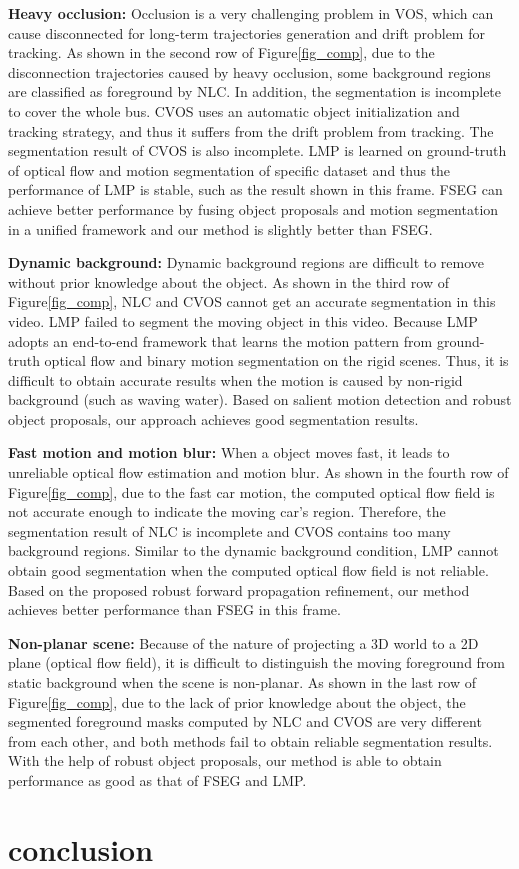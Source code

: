 \documentclass[journal]{IEEEtran}
\makeatletter
\newcommand{\fig}{{Figure}\@\xspace}
\makeatother
\begin{document}
\textbf{Heavy occlusion:}
Occlusion is a very challenging problem in VOS, which can cause disconnected for long-term trajectories generation and drift problem for tracking.
As shown in the second row of \fig \ref{fig_comp}, 
due to the disconnection trajectories caused by heavy occlusion,
some background regions are classified as foreground by NLC.
In addition, the segmentation is incomplete to cover the whole bus.
CVOS uses an automatic object initialization and tracking strategy,
and thus it suffers from the drift problem from tracking.
The segmentation result of CVOS is also incomplete.
LMP is learned on ground-truth of optical flow and motion segmentation of specific dataset and thus the performance of LMP is stable, such as the result shown in this frame.
FSEG can achieve better performance by fusing object proposals and motion segmentation in a unified framework and our method is slightly better than FSEG.

\textbf{Dynamic background:} 
Dynamic background regions are difficult to remove without prior knowledge about the object.
As shown in the third row of \fig \ref{fig_comp}, 
NLC and CVOS cannot get an accurate segmentation in this video.
LMP failed to segment the moving object in this video.
Because LMP adopts an end-to-end framework that learns the motion pattern from ground-truth optical flow and binary motion segmentation on the rigid scenes.
Thus, it is difficult to obtain accurate results when the motion is caused by non-rigid background (such as waving water).
Based on salient motion detection and robust object proposals, 
our approach achieves good segmentation results.

\textbf{Fast motion and motion blur:}
When a object moves fast, it leads to unreliable optical flow estimation and motion blur.
As shown in the fourth row of \fig \ref{fig_comp},
due to the fast car motion, 
the computed optical flow field is not accurate enough to indicate the moving car's region.
Therefore, the segmentation result of NLC is incomplete and CVOS contains too many background regions.
Similar to the dynamic background condition, LMP cannot obtain good segmentation when the computed optical flow field is not reliable.
Based on the proposed robust forward propagation refinement, our method achieves better performance than FSEG in this frame.

\textbf{Non-planar scene:}
Because of the nature of projecting a 3D world to a 2D plane (optical flow field),
it is difficult to distinguish the moving foreground from static background when the scene is non-planar. 
As shown in the last row of \fig \ref{fig_comp},
due to the lack of prior knowledge about the object,
the segmented foreground masks computed by NLC and CVOS are very different from each other,
and both methods fail to obtain reliable segmentation results.
With the help of robust object proposals, 
our method is able to obtain performance as good as that of FSEG and LMP. \section{conclusion}
\label{sec:conclusion}
\end{document}
